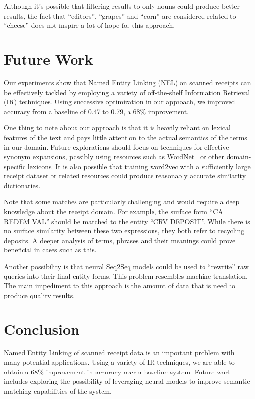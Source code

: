 \documentclass[11pt,a4paper]{article}
\begin{document}
Although it's possible that filtering results to only nouns could
produce better results, the fact that ``editors'', ``grapes'' and
``corn'' are considered related to ``cheese'' does not inspire a lot
of hope for this approach.

\section{Future Work}

Our experiments show that Named Entity Linking (NEL) on scanned
receipts can be effectively tackled by employing a variety of
off-the-shelf Information Retrieval (IR) techniques.  Using
successive optimization in our approach, we improved accuracy from a
baseline of 0.47 to 0.79, a 68\% improvement.

One thing to note about our approach is that it is heavily reliant
on lexical features of the text and pays little attention to the
actual semantics of the terms in our domain.  Future explorations
should focus on techniques for effective synonym expansions,
possibly using resources such as WordNet~\cite{wordnet} or other
domain-specific lexicons.  It is also possible that training
word2vec with a sufficiently large receipt dataset or related
resources could produce reasonably accurate similarity dictionaries.

Note that some matches are particularly challenging and would
require a deep knowledge about the receipt domain.  For example,
the surface form ``CA REDEM VAL'' should be matched to the entity 
``CRV DEPOSIT''.  While there is no surface similarity between these
two expressions, they both refer to recycling deposits.  A deeper
analysis of terms, phrases and their meanings could prove beneficial
in cases such as this.

Another possibility is that neural Seq2Seq models could be used to
``rewrite'' raw queries into their final entity forms.  This problem
resembles machine translation.  The main impediment to this approach
is the amount of data that is need to produce quality results.

\section{Conclusion}
Named Entity Linking of scanned receipt data is an important problem
with many potential applications.  Using a variety of IR techniques,
we are able to obtain a 68\% improvement in accuracy over a baseline
system.   Future work includes exploring the possibility of leveraging
neural models to improve semantic matching capabilities of the system.



\end{document}
